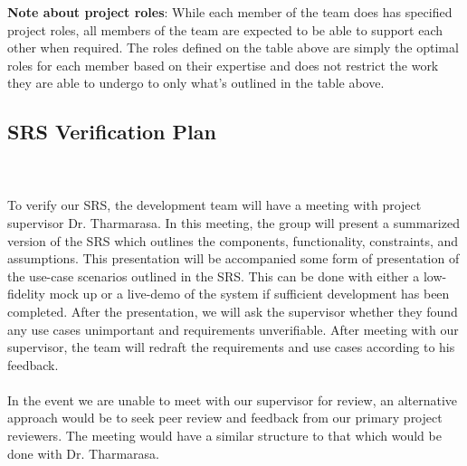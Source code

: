 \documentclass[12pt, titlepage]{article}
\begin{document}
\textbf{Note about project roles}: While each member of the team does has specified project roles, all members of the team are expected to be able to support each other when required. The roles defined on the table above are simply the optimal roles for each member based on their expertise and does not restrict the work they are able to undergo to only what's outlined in the table above.

\subsection{SRS Verification Plan}
\label{section:SRSVerificationPlan}


\\
\\

To verify our SRS, the development team will have a meeting with project supervisor Dr. Tharmarasa. In this meeting, the group will present a summarized version of the SRS which outlines the components, functionality, constraints, and assumptions. This presentation will be accompanied some form of presentation of the use-case scenarios outlined in the SRS. This can be done with either a low-fidelity mock up or a live-demo of the system if sufficient development has been completed. After the presentation, we will ask the supervisor whether they found any use cases unimportant and requirements unverifiable. After meeting with our supervisor, the team will redraft the requirements and use cases according to his feedback. \\\\
In the event we are unable to meet with our supervisor for review, an alternative approach would be to seek peer review and feedback from our primary project reviewers. The meeting would have a similar structure to that which would be done with Dr. Tharmarasa. \\\\
\end{document}
